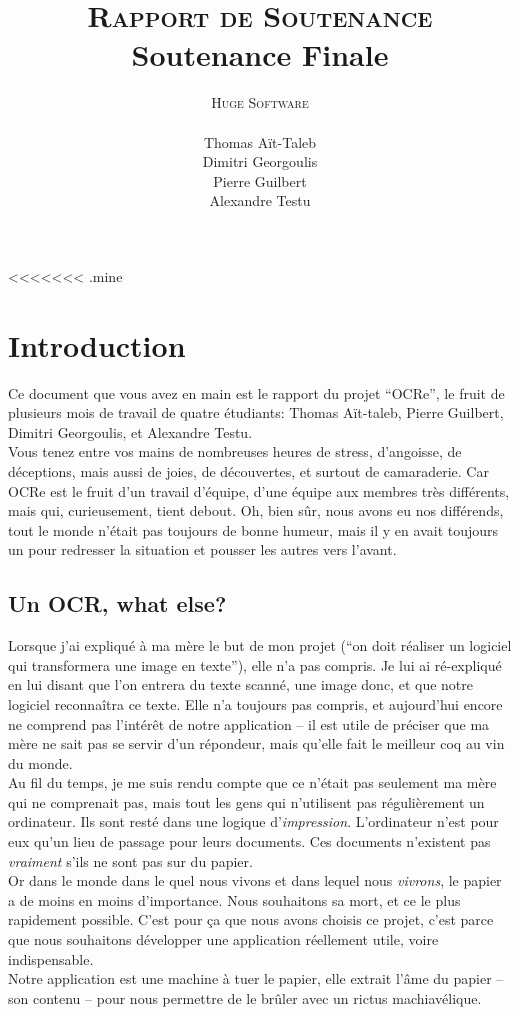 \documentclass[a4paper,10pt]{report}
\title{\textsc{Rapport de Soutenance} \\ Soutenance Finale}
\author{\textsc{Huge Software}\\ \\ Thomas A\"it-Taleb \\ Dimitri Georgoulis \\ Pierre Guilbert \\ Alexandre Testu}
\date{}
\begin{document}
\lstset{language=C}
\dominitoc
\maketitle
\tableofcontents \pagebreak
<<<<<<< .mine
\thispagestyle{fancy}

\chapter{Introduction} %
\label{cha:introduction}

Ce document que vous avez en main est le rapport du projet ``OCRe'', le fruit de plusieurs mois de travail de quatre étudiants: Thomas Aït-taleb, Pierre Guilbert, Dimitri Georgoulis, et Alexandre Testu. \\
Vous tenez entre vos mains de nombreuses heures de stress, d’angoisse, de déceptions, mais aussi de joies, de découvertes, et surtout de camaraderie. Car OCRe est le fruit d’un travail d’équipe, d’une équipe aux membres très différents, mais qui, curieusement, tient debout. Oh, bien sûr, nous avons eu nos différends, tout le monde n’était pas toujours de bonne humeur, mais il y en avait toujours un pour redresser la situation et pousser les autres vers l’avant.


\section{Un OCR, what else?} %
\label{sec:un_ocr_what_else_}
Lorsque j’ai expliqué à ma mère le but de mon projet (``on doit réaliser un logiciel qui transformera une image en texte''), elle n’a pas compris. Je lui ai ré-expliqué en lui disant que l’on entrera du texte scanné, une image donc, et que notre logiciel reconnaîtra ce texte. Elle n’a toujours pas compris, et aujourd’hui encore ne comprend pas l’intérêt de notre application – il est utile de préciser que ma mère ne sait pas se servir d’un répondeur, mais qu’elle fait le meilleur coq au vin du monde. \\
Au fil du temps, je me suis rendu compte que ce n’était pas seulement ma mère qui ne comprenait pas, mais tout les gens qui n’utilisent pas régulièrement un ordinateur. Ils sont resté dans une logique d’\emph{impression}. L’ordinateur n’est pour eux qu’un lieu de passage pour leurs documents. Ces documents n’existent pas \emph{vraiment} s’ils ne sont pas sur du papier. \\
Or dans le monde dans le quel nous vivons et dans lequel nous \emph{vivrons}, le papier a de moins en moins d’importance. Nous souhaitons sa mort, et ce le plus rapidement possible. C’est pour ça que nous avons choisis ce projet, c’est parce que nous souhaitons développer une application réellement utile, voire indispensable. \\
Notre application est une machine à tuer le papier, elle extrait l’âme du papier – son contenu – pour nous permettre de le brûler avec un rictus machiavélique. \\
\end{document}
